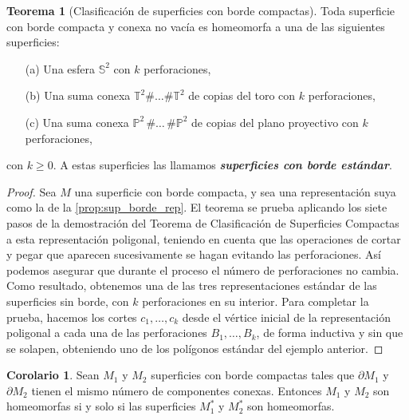 \documentclass[10pt]{report}
\newcommand{\Esfera}{\mathbb{S}^2}
\newcommand{\Toro}{\mathbb{T}^2}
\newcommand{\Proyectivo}{\mathbb{P}^2}
\newcommand{\enfatiza}[1]{\textbf{\textit{#1}}}
\theoremstyle{definition}
\newtheorem{tma}[defin]{Teorema}
\newtheorem{corol}[defin]{Corolario}
\begin{document}
\begin{tma}[Clasificación de superficies con borde compactas]
Toda superficie con borde compacta y conexa no vacía es homeomorfa a una de las siguientes superficies:
\begin{itemize}
\item[(a)] Una esfera $\Esfera$ con $k$ perforaciones,
\item[(b)] Una suma conexa $\Toro \# \dots \# \Toro$ de copias del toro con $k$ perforaciones,
\item[(c)] Una suma conexa $\Proyectivo \,  \# \dots\, \# \Proyectivo$ de copias del plano proyectivo con $k$ perforaciones,
\end{itemize}
con $k\geq 0$.
A estas superficies las llamamos \enfatiza{superficies con borde estándar}.
\end{tma}
\begin{proof}
Sea $M$ una superficie con borde compacta, y sea una representación suya como la de la \autoref{prop:sup_borde_rep}. El teorema se prueba aplicando los siete pasos de la demostración del Teorema de Clasificación de Superficies Compactas a esta representación poligonal, teniendo en cuenta que las operaciones de cortar y pegar que aparecen sucesivamente se hagan evitando las perforaciones. Así podemos asegurar que durante el proceso el número de perforaciones no cambia. Como resultado, obtenemos una de las tres representaciones estándar de las superficies sin borde, con $k$ perforaciones en su interior. Para completar la prueba, hacemos los cortes $c_1,\dots ,c_k$ desde el vértice inicial de la representación poligonal a cada una de las perforaciones $B_1,\dots ,B_k$, de forma inductiva y sin que se solapen, obteniendo uno de los polígonos estándar del ejemplo anterior.
\end{proof}

\begin{corol}
Sean $M_1$ y $M_2$ superficies con borde compactas tales que $\partial M_1$ y $\partial M_2$ tienen el mismo número de componentes conexas. Entonces $M_1$ y $M_2$ son homeomorfas si y solo si las superficies $M_1^*$ y $M_2^*$  son homeomorfas.
\end{corol}
\end{document}
